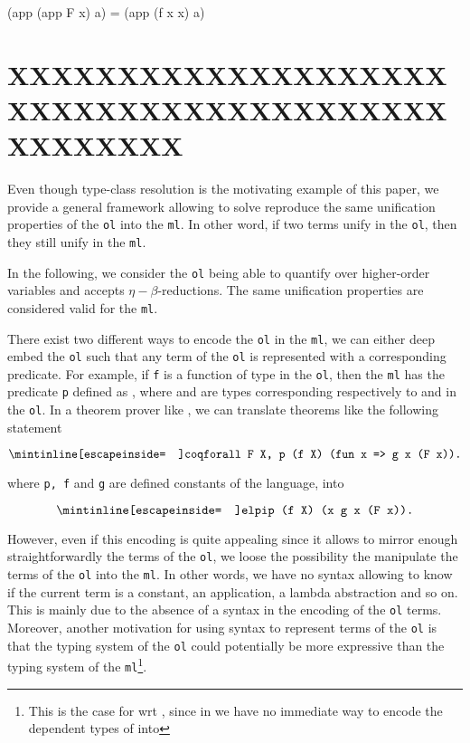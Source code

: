 \documentclass[acmengage]{acmart}
\def\elpi{\proglang{elpi}}
\def\coq{\proglang{coq}}
\newcommand*{\acronym}[1]{\texttt{#1}\xspace}
\def\ol{\acronym{ol}} %
\def\ml{\acronym{ml}} %
\begin{document}
\begin{elpicode}
  (app (app F x) a) = (app (f x x) a)
\end{elpicode}




\section{XXXXXXXXXXXXXXXXXXXXXXXXXXXXXXXXXXXXXXXXXXXXXXXX}

Even though type-class resolution is the motivating example of this paper, we
provide a general framework allowing to solve reproduce the same unification
properties of the \ol into the \ml. In other word, if two terms unify in the
\ol, then they still unify in the \ml. 

In the following, we consider the \ol being able to quantify over higher-order
variables and accepts $\eta-\beta$-reductions. The same unification properties
are considered valid for the \ml.

There exist two different ways to encode the \ol in the \ml, we can either deep
embed the \ol such that any term of the \ol is represented with a corresponding
predicate. For example, if \texttt{f} is a function of type  in
the \ol, then the \ml has the predicate \texttt{p} defined as , where  and  are types corresponding
respectively to  and  in the \ol. In a theorem prover like
\coq, we can translate theorems like the following statement

\begin{equation}
  \texttt{\coqIn{forall F X, p (f X) (fun x => g x (F x)).}}
  \label{eq:coq1}
\end{equation}

where \texttt{p, f} and \texttt{g} are defined constants of the language, into

\begin{equation}
  \texttt{\elpiIn{p (f X) (x\ g x (F x)).}}
\end{equation}

\noindent However, even if this encoding is quite appealing since it allows to
mirror enough straightforwardly the terms of the \ol, we loose the possibility
the manipulate the terms of the \ol into the \ml. In other words, we have no
syntax allowing to know if the current term is a constant, an application, a
lambda abstraction and so on. This is mainly due to the absence of a syntax in
the encoding of the \ol terms. Moreover, another motivation for using syntax to
represent terms of the \ol is that  the typing system of the \ol could
potentially be more expressive than the typing system of the \ml\footnote{This
is the case for \coq wrt \elpi, since in we have no immediate way to encode
the dependent types of \coq into \elpi}.
\end{document}
